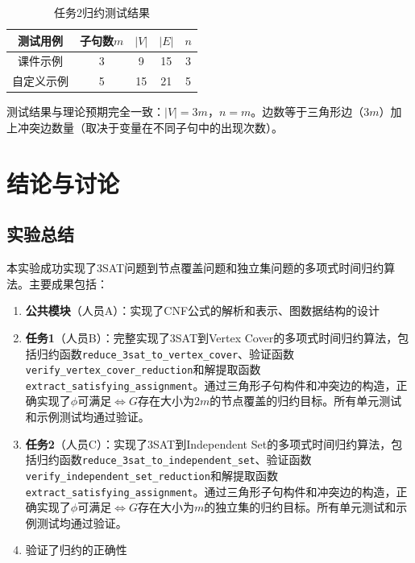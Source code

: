 \documentclass{sysucseexp}
\begin{document}
\begin{table}[H]
    \centering
    \caption{任务2归约测试结果}
    \begin{tabular}{c|c|c|c|c}
        \hline
        测试用例 & 子句数$m$ & $|V|$ & $|E|$ & $n$ \\
        \hline
        课件示例 & 3 & 9 & 15 & 3 \\
        自定义示例 & 5 & 15 & 21 & 5 \\
        \hline
    \end{tabular}
\end{table}

测试结果与理论预期完全一致：$|V| = 3m$，$n = m$。边数等于三角形边（$3m$）加上冲突边数量（取决于变量在不同子句中的出现次数）。


\section{结论与讨论}

\subsection{实验总结}

本实验成功实现了3SAT问题到节点覆盖问题和独立集问题的多项式时间归约算法。主要成果包括：

\begin{enumerate}
    \item \textbf{公共模块}（人员A）：实现了CNF公式的解析和表示、图数据结构的设计
    \item \textbf{任务1}（人员B）：完整实现了3SAT到Vertex Cover的多项式时间归约算法，包括归约函数\texttt{reduce\_3sat\_to\_vertex\_cover}、验证函数\texttt{verify\_vertex\_cover\_reduction}和解提取函数\texttt{extract\_satisfying\_assignment}。通过三角形子句构件和冲突边的构造，正确实现了$\phi$可满足$\Leftrightarrow$$G$存在大小为$2m$的节点覆盖的归约目标。所有单元测试和示例测试均通过验证。
    \item \textbf{任务2}（人员C）：实现了3SAT到Independent Set的多项式时间归约算法，包括归约函数\texttt{reduce\_3sat\_to\_independent\_set}、验证函数\texttt{verify\_independent\_set\_reduction}和解提取函数\texttt{extract\_satisfying\_assignment}。通过三角形子句构件和冲突边的构造，正确实现了$\phi$可满足$\Leftrightarrow$$G$存在大小为$m$的独立集的归约目标。所有单元测试和示例测试均通过验证。
    \item 验证了归约的正确性
\end{enumerate}
\end{document}

